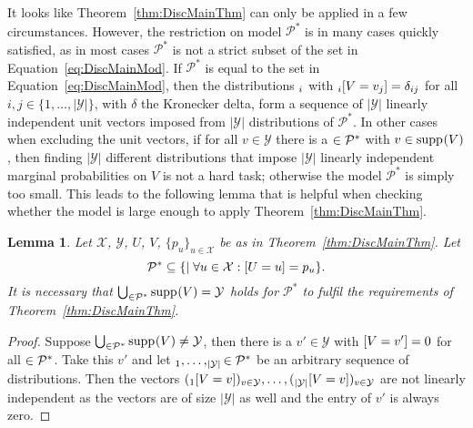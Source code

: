 \documentclass[a4paper]{report}
\theoremstyle{plain}
\newtheorem{lemma}[theorem]{Lemma}
\theoremstyle{definition}
\theoremstyle{remark}
\numberwithin{equation}{chapter}
\let\P\relax
\DeclareMathOperator{\P}{\mathbb{P}}
\DeclareMathOperator{\1}{\mathbbm{1}}
\newcommand{\X}{\mathcal{X}}
\newcommand{\Y}{\mathcal{Y}}
\DeclareMathOperator{\supp}{supp}
\newcommand{\Pmod}{\mathcal{P}^*}
\begin{document}
It looks like Theorem~\ref{thm:DiscMainThm} can only be applied in a few circumstances. However, the restriction on model $\Pmod$ is in many cases quickly satisfied, as in most cases $\Pmod$ is not a strict subset of the set in Equation~\ref{eq:DiscMainMod}. If $\Pmod$ is equal to the set in Equation~\ref{eq:DiscMainMod}, then the distributions $\P_i$ with $\P_i[V=v_j]=\delta_{ij}$ for all $i,j\in\{1,\ldots,|\Y|\}$, with $\delta$ the Kronecker delta, form a sequence of $|\Y|$ linearly independent unit vectors imposed from $|\Y|$ distributions of $\Pmod$. In other cases when excluding the unit vectors, if for all $v\in\Y$ there is a $\P\in\Pmod$ with $v\in\supp_{\P}(V)$, then finding $|\Y|$ different distributions that impose $|\Y|$ linearly independent marginal probabilities on $V$ is not a hard task; otherwise the model $\Pmod$ is simply too small. This leads to the following lemma that is helpful when checking whether the model is large enough to apply Theorem~\ref{thm:DiscMainThm}.
\begin{lemma}\label{lem:DiscMainReq}
Let $\X$, $\Y$, $U$, $V$, $\{p_u\}_{u\in\X}$ be as in Theorem~\ref{thm:DiscMainThm}.  Let
\begin{equation}
\Pmod\subseteq\{\P\mid\forall u\in\X:\P[U=u]=p_u\}.
\end{equation}
It is necessary that $\bigcup_{\P\in\Pmod}\supp_{\P}(V)=\Y$ holds for $\Pmod$ to fulfil the requirements of Theorem~\ref{thm:DiscMainThm}.
\end{lemma}
\begin{proof}
Suppose $\bigcup_{\P\in\Pmod}\supp_{\P}(V)\neq\Y$, then there is a $v'\in\Y$ with $\P[V=v']=0$ for all $\P\in\Pmod$. Take this $v'$ and let $\P_1,\ldots,\P_{|\Y|}\in\Pmod$ be an arbitrary sequence of distributions. Then the vectors $(\P_1[V=v])_{v\in\Y},\ldots,(\P_{|\Y|}[V=v])_{v\in\Y}$ are not linearly independent as the vectors are of size $|\Y|$ as well and the entry of $v'$ is always zero.
\end{proof}
\end{document}
